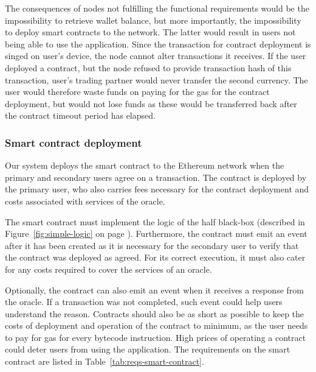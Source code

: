 The consequences of nodes not fulfilling the functional requirements would be the impossibility to retrieve wallet balance, but more importantly, the impossibility to deploy smart contracts to the network. The latter would result in users not being able to use the application. Since the transaction for contract deployment is singed on user’s device, the node cannot alter transactions it receives. If the user deployed a contract, but the node refused to provide transaction hash of this transaction, user’s trading partner would never transfer the second currency. The user would therefore waste funds on paying for the gas for the contract deployment, but would not lose funds as these would be transferred back after the contract timeout period has elapsed.

\subsubsection{Smart contract deployment}
Our system deploys the smart contract to the Ethereum network when the primary and secondary users agree on a transaction. The contract is deployed by the primary user, who also carries fees necessary for the contract deployment and costs associated with services of the oracle\footnotemark.
% 

The smart contract must implement the logic of the half black-box (described in Figure~\ref{fig:simple-logic} on page \pageref{fig:simple-logic}). Furthermore, the contract must emit an event after it has been created as it is necessary for the secondary user to verify that the contract was deployed as agreed. For its correct execution, it must also cater for any costs required to cover the services of an oracle.

Optionally, the contract can also emit an event when it receives a response from the oracle. If a transaction was not completed, such event could help users understand the reason. Contracts should also be as short as possible to keep the costs of deployment and operation of the contract to minimum, as the user needs to pay for gas for every bytecode instruction. High prices of operating a contract could deter users from using the application. The requirements on the smart contract are listed in Table~\ref{tab:reqs-smart-contract}.

